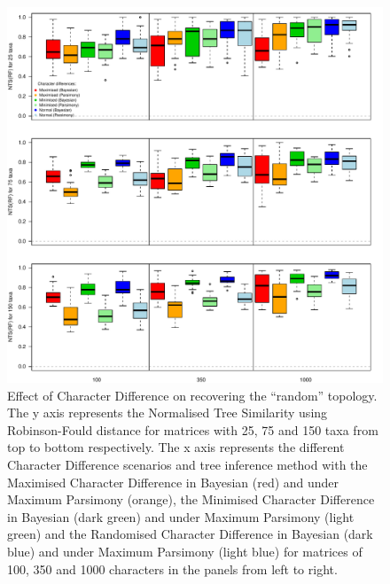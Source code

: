 \documentclass[12pt,letterpaper]{article}
\begin{document}
\begin{figure}[!htbp]
\centering
   \includegraphics[width=1\textwidth]{../Figures/RF_results_null.pdf} 
\caption{\small{Effect of Character Difference on recovering the ``random'' topology. The y axis represents the Normalised Tree Similarity using Robinson-Fould distance for matrices with 25, 75 and 150 taxa from top to bottom respectively. The x axis represents the different Character Difference scenarios and tree inference method with the Maximised Character Difference in Bayesian (red) and under Maximum Parsimony (orange), the Minimised Character Difference in Bayesian (dark green) and under Maximum Parsimony (light green) and the Randomised Character Difference in Bayesian (dark blue) and under Maximum Parsimony (light blue) for matrices of 100, 350 and 1000 characters in the panels from left to right.}}
\label{Fig:RF_results_rand}
\end{figure}
\end{document}
